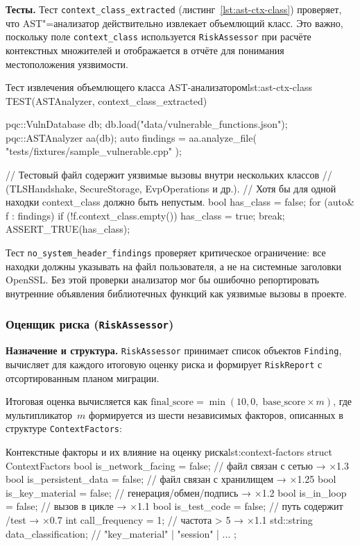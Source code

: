 \textbf{Тесты.}
Тест \texttt{context\_class\_extracted} (листинг~\ref{lst:ast-ctx-class})
проверяет, что AST"=анализатор действительно извлекает объемлющий
класс.
Это важно, поскольку поле \texttt{context\_class} используется
\texttt{RiskAssessor} при расчёте контекстных множителей и
отображается в отчёте для понимания местоположения уязвимости.

\begin{itmolisting}[C++]{Тест извлечения объемлющего класса AST-анализатором}{lst:ast-ctx-class}
TEST(ASTAnalyzer, context_class_extracted) {
    pqc::VulnDatabase db;
    db.load("data/vulnerable_functions.json");
    pqc::ASTAnalyzer aa(db);
    auto findings = aa.analyze_file(
        "tests/fixtures/sample_vulnerable.cpp"
    );

    // Тестовый файл содержит уязвимые вызовы внутри нескольких классов
    // (TLSHandshake, SecureStorage, EvpOperations и др.).
    // Хотя бы для одной находки context_class должно быть непустым.
    bool has_class = false;
    for (auto& f : findings)
        if (!f.context_class.empty()) { has_class = true; break; }
    ASSERT_TRUE(has_class);
}
\end{itmolisting}

Тест \texttt{no\_system\_header\_findings} проверяет критическое
ограничение: все находки должны указывать на файл пользователя, а
не на системные заголовки OpenSSL.
Без этой проверки анализатор мог бы ошибочно репортировать
внутренние объявления библиотечных функций как уязвимые вызовы
в проекте.

\subsubsection{Оценщик риска (\texttt{RiskAssessor})}

\textbf{Назначение и структура.}
\texttt{RiskAssessor} принимает список объектов \texttt{Finding},
вычисляет для каждого итоговую оценку риска и формирует
\texttt{RiskReport} с отсортированным планом миграции.

Итоговая оценка вычисляется как
$\text{final\_score} = \min(10{,}0,\;\text{base\_score} \times m)$,
где мультипликатор~$m$ формируется из шести независимых факторов,
описанных в структуре \texttt{ContextFactors}:

\begin{itmolisting}[C++]{Контекстные факторы и их влияние на оценку риска}{lst:context-factors}
struct ContextFactors {
    bool is_network_facing  = false; // файл связан с сетью  → ×1.3
    bool is_persistent_data = false; // файл связан с хранилищем → ×1.25
    bool is_key_material    = false; // генерация/обмен/подпись → ×1.2
    bool is_in_loop         = false; // вызов в цикле → ×1.1
    bool is_test_code       = false; // путь содержит /test → ×0.7
    int  call_frequency     = 1;     // частота > 5 → ×1.1
    std::string data_classification; // "key_material" | "session" | ...
};
\end{itmolisting}

